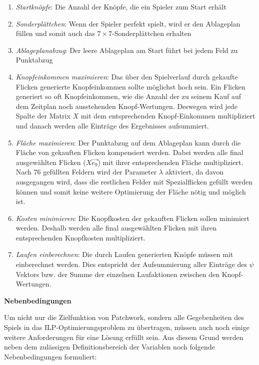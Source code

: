 \pagebreak

\begin{enumerate}
    \item \emph{Startknöpfe}: Die Anzahl der Knöpfe, die ein Spieler zum Start erhält
    \item \vspace*{-0.175cm} \emph{Sonderplättchen}: Wenn der Spieler perfekt spielt, wird er den Ablageplan füllen und somit auch das $7\times 7$-Sonderplättchen erhalten
    \item \vspace*{-0.175cm} \emph{Ablageplanabzug}: Der leere Ablageplan am Start führt bei jedem Feld zu Punktabzug
    \item \vspace*{-0.175cm} \emph{Knopfeinkommen maximieren}: Das über den Spielverlauf durch gekaufte Flicken generierte Knopfeinkommen sollte möglichst hoch sein. Ein Flicken generiert so oft Knopfeinkommen, wie die Anzahl der zu seinem Kauf auf dem Zeitplan noch ausstehenden Knopf-Wertungen. Deswegen wird jede Spalte der Matrix $X$ mit dem entsprechenden Knopf-Einkommen multipliziert und danach werden alle Einträge des Ergebnisses aufsummiert.
    \item \vspace*{-0.175cm} \emph{Fläche maximieren}: Der Punktabzug auf dem Ablageplan kann durch die Fläche von gekauften Flicken kompensiert werden. Dabei werden alle final ausgewählten Flicken ($X\vec{e_9}$) mit ihrer entsprechenden Fläche multipliziert. Nach 76 gefüllten Feldern wird der Parameter $\lambda$ aktiviert, da davon ausgegangen wird, dass die restlichen Felder mit Spezialflicken gefüllt werden können und somit keine weitere Optimierung der Fläche nötig und möglich ist.
    \item \vspace*{-0.175cm} \emph{Kosten minimieren}: Die Knopfkosten der gekauften Flicken sollen minimiert werden. Deshalb werden alle final ausgewählten Flicken mit ihren entsprechenden Knopfkosten multipliziert.
    \item \vspace*{-0.175cm} \emph{Laufen einberechnen}: Die durch Laufen generierten Knöpfe müssen mit einberechnet werden. Dies entspricht der Aufsummierung aller Einträge des $\psi$ Vektors bzw. der Summe der einzelnen Laufaktionen zwischen den Knopf-Wertungen.
\end{enumerate}

\textbf{Nebenbedingungen}

Um nicht nur die Zielfunktion von Patchwork, sondern alle Gegebenheiten des Spiels in das \ac{ILP}-Optimierungsproblem zu übertragen, müssen auch noch einige weitere Anforderungen für eine Lösung erfüllt sein. Aus diesem Grund werden neben dem zulässigen Definitionsbereich der Variablen noch folgende Nebenbedingungen formuliert:
%

